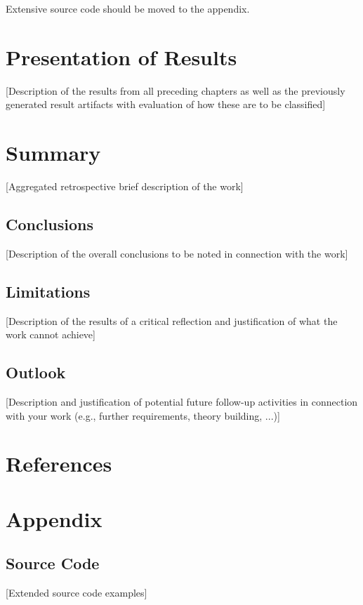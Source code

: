 \documentclass[oneside,12pt]{book}
\begin{document}
Extensive source code should be moved to the appendix.

\chapter{Presentation of Results}
[Description of the results from all preceding chapters as well as the previously generated result artifacts with evaluation of how these are to be classified]

\chapter{Summary}
[Aggregated retrospective brief description of the work]

\section{Conclusions}
[Description of the overall conclusions to be noted in connection with the work]

\section{Limitations}
[Description of the results of a critical reflection and justification of what the work cannot achieve]

\section{Outlook}
[Description and justification of potential future follow-up activities in connection with your work (e.g., further requirements, theory building, ...)]

\chapter*{References}
\printbibliography[heading=none,title={}]

\printglossaries

\appendix

\chapter{Appendix}

\section{Source Code}
[Extended source code examples]
\end{document}
